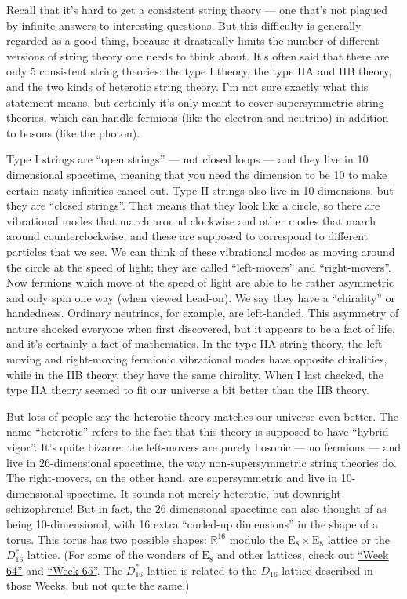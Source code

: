 \documentclass{article}
\begin{document}
Recall that it's hard to get a consistent string theory --- one that's
not plagued by infinite answers to interesting questions. But this
difficulty is generally regarded as a good thing, because it drastically
limits the number of different versions of string theory one needs to
think about. It's often said that there are only 5 consistent string
theories: the type I theory, the type IIA and IIB theory, and the two
kinds of heterotic string theory. I'm not sure exactly what this
statement means, but certainly it's only meant to cover supersymmetric
string theories, which can handle fermions (like the electron and
neutrino) in addition to bosons (like the photon).

Type I strings are ``open strings'' --- not closed loops --- and they
live in 10 dimensional spacetime, meaning that you need the dimension to
be 10 to make certain nasty infinities cancel out. Type II strings also
live in 10 dimensions, but they are ``closed strings''. That means that
they look like a circle, so there are vibrational modes that march
around clockwise and other modes that march around counterclockwise, and
these are supposed to correspond to different particles that we see. We
can think of these vibrational modes as moving around the circle at the
speed of light; they are called ``left-movers'' and ``right-movers''.
Now fermions which move at the speed of light are able to be rather
asymmetric and only spin one way (when viewed head-on). We say they have
a ``chirality'' or handedness. Ordinary neutrinos, for example, are
left-handed. This asymmetry of nature shocked everyone when first
discovered, but it appears to be a fact of life, and it's certainly a
fact of mathematics. In the type IIA string theory, the left-moving and
right-moving fermionic vibrational modes have opposite chiralities,
while in the IIB theory, they have the same chirality. When I last
checked, the type IIA theory seemed to fit our universe a bit better
than the IIB theory.

But lots of people say the heterotic theory matches our universe even
better. The name ``heterotic'' refers to the fact that this theory is
supposed to have ``hybrid vigor''. It's quite bizarre: the left-movers
are purely bosonic --- no fermions --- and live in \(26\)-dimensional
spacetime, the way non-supersymmetric string theories do. The
right-movers, on the other hand, are supersymmetric and live in 10-
dimensional spacetime. It sounds not merely heterotic, but downright
schizophrenic! But in fact, the \(26\)-dimensional spacetime can also
thought of as being 10-dimensional, with 16 extra ``curled-up
dimensions'' in the shape of a torus. This torus has two possible
shapes: \(\mathbb{R}^16\) modulo the
\(\mathrm{E}_8 \times \mathrm{E}_8\) lattice or the \(D_{16}^*\)
lattice. (For some of the wonders of \(\mathrm{E}_8\) and other
lattices, check out \protect\hyperlink{week64}{``Week 64''} and
\protect\hyperlink{week65}{``Week 65''}. The \(D_{16}^*\) lattice is
related to the \(D_{16}\) lattice described in those Weeks, but not
quite the same.)
\end{document}
